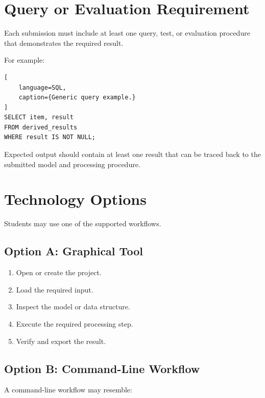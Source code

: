 \documentclass[11pt]{article}
\begin{document}
\section{Query or Evaluation Requirement}

Each submission must include at least one query, test, or evaluation procedure
that demonstrates the required result.

For example:

\begin{lstlisting}[
    language=SQL,
    caption={Generic query example.}
]
SELECT item, result
FROM derived_results
WHERE result IS NOT NULL;
\end{lstlisting}

Expected output should contain at least one result that can be traced back to
the submitted model and processing procedure.

\section{Technology Options}

Students may use one of the supported workflows.

\subsection{Option A: Graphical Tool}

\begin{enumerate}
    \item Open or create the project.
    \item Load the required input.
    \item Inspect the model or data structure.
    \item Execute the required processing step.
    \item Verify and export the result.
\end{enumerate}

\subsection{Option B: Command-Line Workflow}

A command-line workflow may resemble:
\end{document}
